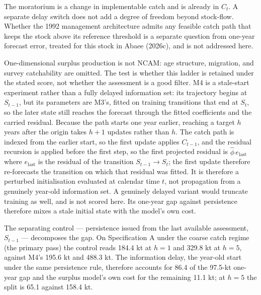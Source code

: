 \documentclass[11pt]{article}
\begin{document}
The moratorium is a change in implementable catch and is already in
\(C_t\). A separate delay switch does not add a degree of freedom beyond
stock-flow. Whether the 1992 management architecture admits any feasible
catch path that keeps the stock above its reference threshold is a
separate question from one-year forecast error, treated for this stock
in Abaee (2026c), and is not addressed
here.

One-dimensional surplus production is not NCAM: age structure,
migration, and survey catchability are omitted. The test is whether this
ladder is retained under the stated score, not whether the assessment is
a good filter. M4 is a stale-start experiment rather than a fully delayed information
set: its trajectory begins at \(S_{t-1}\), but its parameters are
M3's, fitted on training transitions that end at \(S_t\), so the
later state still reaches the forecast through the fitted coefficients
and the carried residual. Because the path starts one year earlier,
reaching a target \(h\) years after the origin takes \(h+1\) updates
rather than \(h\). The catch path is indexed from the earlier start, so
the first update applies \(C_{t-1}\), and the residual recursion is
applied before the first step, so the first projected residual is
\(\hat\phi\,e_{\mathrm{last}}\) where \(e_{\mathrm{last}}\) is the
residual of the transition \(S_{t-1}\to S_t\); the first update
therefore re-forecasts the transition on which that residual was fitted.
It is therefore a perturbed
initialisation evaluated at calendar time \(t\), not propagation from a
genuinely year-old information set. A genuinely delayed variant would truncate
training as well, and is not scored here. Its one-year gap against
persistence therefore mixes a stale initial state with the model's own
cost.

The separating control --- persistence issued from the last available
assessment, \(S_{t-1}\) --- decomposes the gap. On Specification A under
the coarse catch regime (the primary pass) the control reads 184.4 kt at
\(h = 1\) and 329.8 kt at \(h = 5\), against M4's 195.6 kt and 488.3 kt.
The information delay, the year-old start under the same persistence
rule, therefore accounts for 86.4 of the 97.5-kt one-year gap and the
surplus model's own cost for the remaining 11.1 kt; at \(h = 5\) the
split is 65.1 against 158.4 kt.
\end{document}
